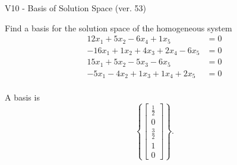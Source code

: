 \begin{exercise}
  \begin{exerciseTitle}V10 - Basis of Solution Space (ver. 53)\end{exerciseTitle}
  \begin{exerciseStatement}
    Find a basis for the solution space of the homogeneous system 
\begin{align*}
 12 x_ 1 + 5 x_ 2 -6 x_ 4 + 1 x_ 5 &= 0  \\ 
  -16 x_ 1 + 1 x_ 2 + 4 x_ 3 + 2 x_ 4 -6 x_ 5 &= 0  \\ 
  15 x_ 1 + 5 x_ 2 -5 x_ 3 -6 x_ 5 &= 0  \\ 
  -5 x_ 1 -4 x_ 2 + 1 x_ 3 + 1 x_ 4 + 2 x_ 5 &= 0  \\ 
 \end{align*}


 
  \end{exerciseStatement}

  \begin{exerciseAnswer}
   A basis is   
\[\left\{\left[\begin{array}{c}
\frac{1}{2} \\
0 \\
\frac{3}{2} \\
1 \\
0
\end{array}\right]\right\}.\]

  


  \end{exerciseAnswer}
\end{exercise}